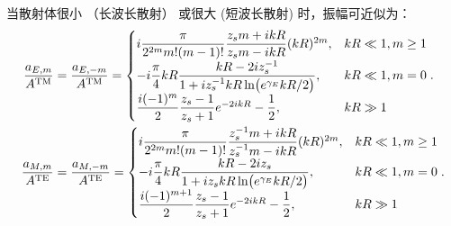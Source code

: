 \begin{exbox}
	当散射体很小 （长波长散射） 或很大 (短波长散射) 时，振幅可近似为：
	\begin{align*}
		\frac{a_{E,m}}{A^{\rm TM}}&=\frac{a_{E,-m}}{A^{\rm TM}}=
		\begin{cases}
			i\dfrac{\pi}{2^{2m}m!(m-1)!}\dfrac{z_sm+ikR}{z_sm-ikR}(kR)^{2m},                       & kR\ll1,m\geq1 \\[6pt]
			-i\dfrac{\pi}{4}kR\dfrac{kR-2iz_s^{-1}}{1+iz_s^{-1}kR\ln\bigl(e^{\gamma_E}kR/2\bigr)}, & kR\ll1,m=0    \\[6pt]
			\dfrac{i(-1)^m}{2}\dfrac{z_s-1}{z_s+1}e^{-2ikR}-\dfrac{1}{2},                          & kR\gg1
		\end{cases}.\\
		\frac{a_{M,m}}{A^{\rm TE}}&=\frac{a_{M,-m}}{A^{\rm TE}}=
		\begin{cases}
			i\dfrac{\pi}{2^{2m}m!(m-1)!}\dfrac{z_s^{-1}m+ikR}{z_s^{-1}m-ikR}(kR)^{2m},   & kR\ll1,m\geq1 \\[6pt]
			-i\dfrac{\pi}{4}kR\dfrac{kR-2iz_s}{1+iz_skR\ln\bigl(e^{\gamma_E}kR/2\bigr)}, & kR\ll1,m=0    \\[6pt]
			\dfrac{i(-1)^{m+1}}{2}\dfrac{z_s-1}{z_s+1}e^{-2ikR}-\dfrac{1}{2},            & kR\gg1
		\end{cases}.
	\end{align*}
\end{exbox}

